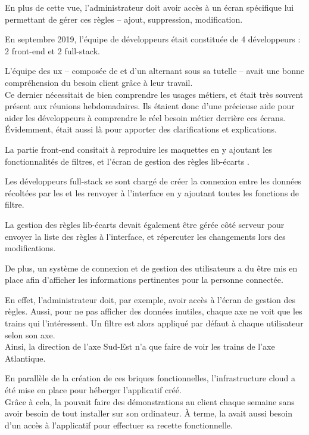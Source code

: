 En plus de cette vue, l'administrateur doit avoir accès à un écran spécifique lui permettant de gérer ces règles -- ajout, suppression, modification.

En septembre 2019, l'équipe de développeurs était constituée de 4 développeurs : 2 \gls{front-end} et 2 \gls{full-stack}.

L'équipe des \gls{ux} -- composée de \stefan et d'un alternant sous sa tutelle -- avait une bonne compréhension du besoin client grâce à leur travail.\\
Ce dernier nécessitait de bien comprendre les usages métiers, et \stefan était très souvent présent aux réunions hebdomadaires. Ils étaient donc d'une précieuse aide pour aider les développeurs à comprendre le réel besoin métier derrière ces écrans.\\
Évidemment, \damien était aussi là pour apporter des clarifications et explications.


La partie \gls{front-end} consitait à reproduire les maquettes en y ajoutant les fonctionnalités de filtres, et l'écran de gestion des règles \og lib-écarts \fg.


Les développeurs \gls{full-stack} se sont chargé de créer la connexion entre les données récoltées par les \ds et les renvoyer à l'interface en y ajoutant toutes les fonctions de filtre.

La gestion des règles lib-écarts devait également être gérée côté serveur pour envoyer la liste des règles à l'interface, et répercuter les changements lors des modifications.


De plus, un système de connexion et de gestion des utilisateurs a du être mis en place afin d'afficher les informations pertinentes pour la personne connectée.

En effet, l'administrateur doit, par exemple, avoir accès à l'écran de gestion des règles. Aussi, pour ne pas afficher des données inutiles, chaque axe ne  voit que les trains qui l'intéressent. Un filtre est alors appliqué par défaut à chaque utilisateur selon son axe.\\
Ainsi, la direction de l'axe Sud-Est n'a que faire de voir les trains de l'axe Atlantique.


En parallèle de la création de ces briques fonctionnelles, l'infrastructure cloud a été mise en place pour héberger l'applicatif créé.\\
Grâce à cela, la \df pouvait faire des démonstrations au client chaque semaine sans avoir besoin de tout installer sur son ordinateur. À terme, la \sncf avait aussi besoin d'un accès à l'applicatif pour effectuer sa recette fonctionnelle.

